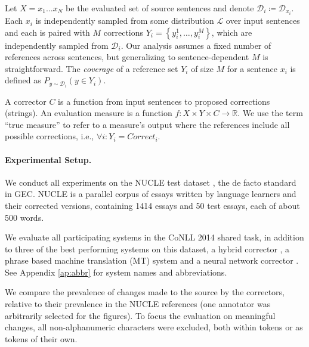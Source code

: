 \documentclass[letterpaper, 11pt]{article}
\begin{document}
Let $X=x_{1}\ldots x_{N}$ be the evaluated set of source sentences and denote $\mathcal{D}_{i}\coloneqq \mathcal{D}_{x_i}$. Each $x_{i}$ is independently sampled from some 
distribution $\mathcal{L}$ over input sentences 
and each is paired with $M$ corrections $Y_i = \left\{y_{i}^{1},\ldots, y_{i}^{M}\right\}$,
which are independently sampled from $\mathcal{D}_{i}$. Our analysis assumes a fixed number of references across sentences, 
but generalizing to sentence-dependent $M$ is straightforward.
The {\it coverage} of a reference set $Y_i$ of size $M$ for a sentence $x_i$ is defined as $P_{y \sim \mathcal{D}_i}(y \in Y_i)$.

A corrector $C$ is a function from input sentences to proposed corrections (strings).
An evaluation measure is a function $f\colon X \times Y \times C\to \mathbb{R}$. We use the term ``true measure'' to refer to a measure's output where the references include all possible corrections, 
i.e., $\forall i\colon Y_i=Correct_i$.

\paragraph{Experimental Setup.}\label{par:experimental_setup}
We conduct all experiments on the NUCLE test dataset \cite{dahlmeier2013building},
the de facto standard in GEC.
NUCLE is a parallel corpus of essays written by language learners and their corrected versions,
containing 1414 essays and 50 test essays, each of about 500 words.

We evaluate all participating systems in the CoNLL 2014 shared task,
in addition to three of the best performing systems on this dataset,
a hybrid corrector \cite{rozovskaya2016grammatical}, a phrase based machine translation (MT) system \cite{junczysdowmunt-grundkiewicz:2016:EMNLP2016} 
and a neural network corrector \cite{xie2016neural}.
See Appendix \ref{ap:abbr} for system names and abbreviations. 

We compare the prevalence of changes made to the source by the correctors,
relative to their prevalence in the NUCLE references (one annotator was arbitrarily 
selected for the figures). 
To focus the evaluation on meaningful changes, all non-alphanumeric characters were 
excluded, both within tokens or as tokens of their own.
\end{document}
